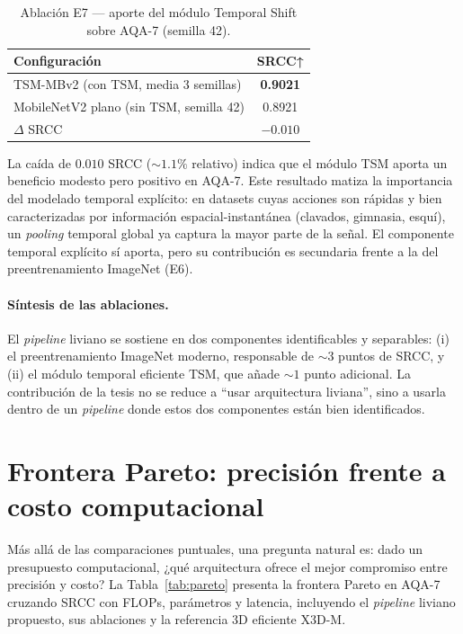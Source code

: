 \begin{table}[H]
\centering
\caption{Ablación E7 — aporte del módulo Temporal Shift sobre AQA-7 (semilla 42).}
\label{tab:ablation_tsm}
\small
\begin{tabular}{lc}
\toprule
\textbf{Configuración} & \textbf{SRCC}↑ \\
\midrule
TSM-MBv2 (con TSM, media 3 semillas) & \textbf{0.9021} \\
MobileNetV2 plano (sin TSM, semilla 42) & 0.8921 \\
\midrule
$\Delta$ SRCC & $-0.010$ \\
\bottomrule
\end{tabular}
\end{table}

La caída de $0.010$ \ac{SRCC} ($\sim 1.1\%$ relativo) indica que el módulo \ac{TSM} aporta un beneficio modesto pero positivo en AQA-7. Este resultado matiza la importancia del modelado temporal explícito: en datasets cuyas acciones son rápidas y bien caracterizadas por información espacial-instantánea (clavados, gimnasia, esquí), un \textit{pooling} temporal global ya captura la mayor parte de la señal. El componente temporal explícito sí aporta, pero su contribución es secundaria frente a la del preentrenamiento ImageNet (E6).

\paragraph{Síntesis de las ablaciones.} El \textit{pipeline} liviano se sostiene en dos componentes identificables y separables: (i) el preentrenamiento ImageNet moderno, responsable de $\sim 3$ puntos de \ac{SRCC}, y (ii) el módulo temporal eficiente \ac{TSM}, que añade $\sim 1$ punto adicional. La contribución de la tesis no se reduce a ``usar arquitectura liviana'', sino a usarla dentro de un \textit{pipeline} donde estos dos componentes están bien identificados.

\section{Frontera Pareto: precisión frente a costo computacional}
\label{sec:pareto}

Más allá de las comparaciones puntuales, una pregunta natural es: dado un presupuesto computacional, ¿qué arquitectura ofrece el mejor compromiso entre precisión y costo? La Tabla~\ref{tab:pareto} presenta la frontera Pareto en AQA-7 cruzando \ac{SRCC} con \ac{FLOPs}, parámetros y latencia, incluyendo el \textit{pipeline} liviano propuesto, sus ablaciones y la referencia 3D eficiente X3D-M.

